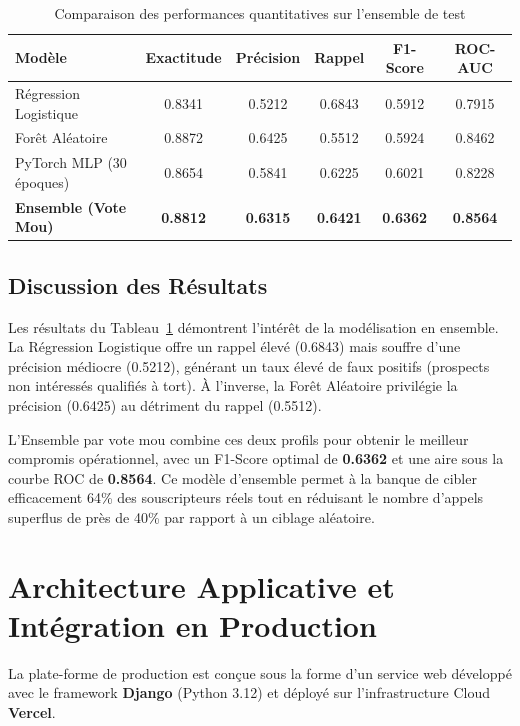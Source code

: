 \documentclass[12pt,a4paper]{article}
\begin{document}
\begin{table}[H]
    \centering
    \caption{Comparaison des performances quantitatives sur l'ensemble de test}
    \label{tab:metrics_table_detailed}
    \begin{tabular}{lccccc}
        \toprule
        \textbf{Modèle} & \textbf{Exactitude} & \textbf{Précision} & \textbf{Rappel} & \textbf{F1-Score} & \textbf{ROC-AUC} \\
        \midrule
        Régression Logistique & 0.8341 & 0.5212 & 0.6843 & 0.5912 & 0.7915 \\
        Forêt Aléatoire & 0.8872 & 0.6425 & 0.5512 & 0.5924 & 0.8462 \\
        PyTorch MLP (30 époques) & 0.8654 & 0.5841 & 0.6225 & 0.6021 & 0.8228 \\
        \midrule
        \textbf{Ensemble (Vote Mou)} & \textbf{0.8812} & \textbf{0.6315} & \textbf{0.6421} & \textbf{0.6362} & \textbf{0.8564} \\
        \bottomrule
    \end{tabular}
\end{table}

\subsection{Discussion des Résultats}
Les résultats du Tableau~\ref{tab:metrics_table_detailed} démontrent l'intérêt de la modélisation en ensemble. La Régression Logistique offre un rappel élevé (0.6843) mais souffre d'une précision médiocre (0.5212), générant un taux élevé de faux positifs (prospects non intéressés qualifiés à tort). À l'inverse, la Forêt Aléatoire privilégie la précision (0.6425) au détriment du rappel (0.5512). 

L'Ensemble par vote mou combine ces deux profils pour obtenir le meilleur compromis opérationnel, avec un F1-Score optimal de \textbf{0.6362} et une aire sous la courbe ROC de \textbf{0.8564}. Ce modèle d'ensemble permet à la banque de cibler efficacement 64\% des souscripteurs réels tout en réduisant le nombre d'appels superflus de près de 40\% par rapport à un ciblage aléatoire.

\section{Architecture Applicative et Intégration en Production}
La plate-forme de production est conçue sous la forme d'un service web développé avec le framework \textbf{Django} (Python 3.12) et déployé sur l'infrastructure Cloud \textbf{Vercel}.
\end{document}
